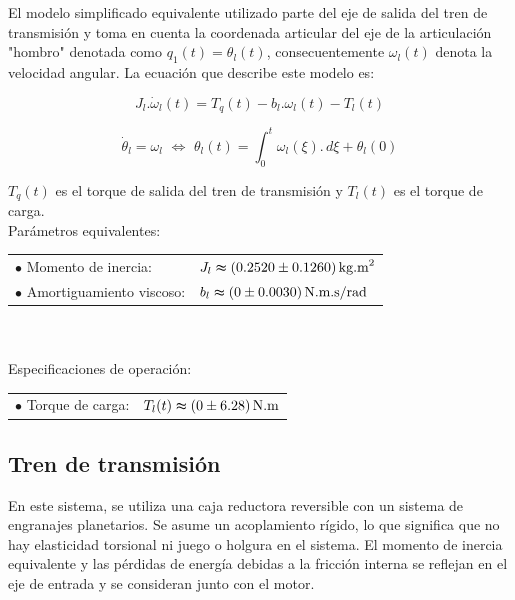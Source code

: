 \documentclass{article}
\begin{document}
    El modelo simplificado equivalente utilizado parte del eje de salida del tren de transmisión y toma en 
    cuenta la coordenada articular del eje de la articulación "hombro" denotada como $q_1(t) = \theta_l(t)$, 
    consecuentemente $\omega_l(t)$ denota la velocidad angular. La ecuación que describe este modelo es:

    \begin{equation}\label{eq:carga_mecanica1}
        J_{l}.\dot{\omega}_{l}(t) = T_{q}(t)-b_{l}.\omega_{l}(t)-T_{l}(t)
    \end{equation}

    \begin{equation}\label{eq:carga_mecanica2}
        \dot{\theta}_{l} = \omega_{l} \,\, \Leftrightarrow \,\, \theta_{l}(t) = \int_{0}^{t} \omega_{l}(\xi). \,d\xi + \theta_{l}(0)
    \end{equation}

    $T_q(t)$ es el torque de salida del tren de transmisión y $T_l(t)$ es el torque de carga.\\

    \noindent Parámetros equivalentes:\\

    \begin{tabular}{@{} p{} p{} @{}}
        \(\bullet\) Momento de inercia: & \(J_l \thickapprox (0.2520 \pm 0.1260) \, \text{kg.m}^2\) \\
        \(\bullet\) Amortiguamiento viscoso: & \(b_l \thickapprox (0 \pm 0.0030) \, \text{N.m.s/rad}\)
    \end{tabular}
    \\\\
    \noindent Especificaciones de operación:\\

    \begin{tabular}{@{} p{} p{} @{}}
        \(\bullet\) Torque de carga: & \(T_l(t) \thickapprox (0 \pm 6.28) \, \text{N.m}\)
    \end{tabular}
    

\subsection{Tren de transmisión}

    En este sistema, se utiliza una caja reductora reversible con un sistema de engranajes planetarios. Se 
    asume un acoplamiento rígido, lo que significa que no hay elasticidad torsional ni 
    juego o holgura en el sistema. El momento de inercia equivalente y las pérdidas de energía debidas a la 
    fricción interna se reflejan en el eje de entrada y se consideran junto con el motor.
\end{document}

